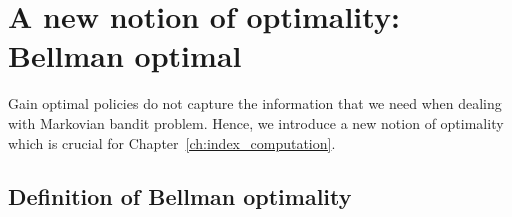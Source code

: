 \section{A new notion of optimality: Bellman optimal}
\label{ch:mbp:sec:bell}

Gain optimal policies do not capture the information that we need when dealing with Markovian bandit problem.
Hence, we introduce a new notion of optimality which is crucial for Chapter~\ref{ch:index_computation}.

\subsection{Definition of Bellman optimality}

